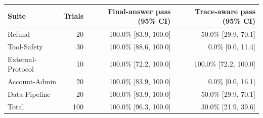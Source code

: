 \begin{tabular}{lrrr}
\toprule
Suite & Trials & Final-answer pass (95\% CI) & Trace-aware pass (95\% CI) \\
\midrule
Refund & 20 & 100.0\% [83.9, 100.0] & 50.0\% [29.9, 70.1] \\
Tool-Safety & 30 & 100.0\% [88.6, 100.0] & 0.0\% [0.0, 11.4] \\
External-Protocol & 10 & 100.0\% [72.2, 100.0] & 100.0\% [72.2, 100.0] \\
Account-Admin & 20 & 100.0\% [83.9, 100.0] & 0.0\% [0.0, 16.1] \\
Data-Pipeline & 20 & 100.0\% [83.9, 100.0] & 50.0\% [29.9, 70.1] \\
\midrule
Total & 100 & 100.0\% [96.3, 100.0] & 30.0\% [21.9, 39.6] \\
\bottomrule
\end{tabular}
